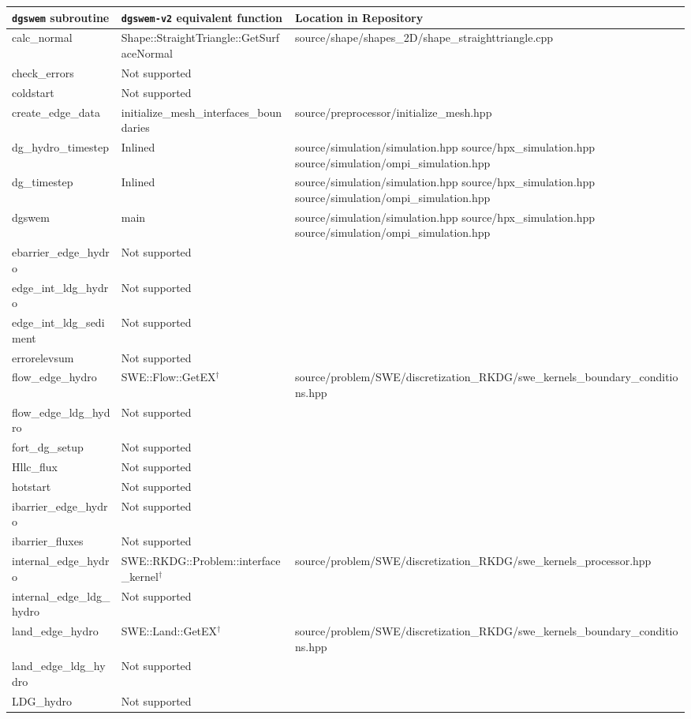 { \scriptsize
\begin{longtable}{ l | p{55mm} | p{86mm} }
\hline
\hline
{\normalsize \texttt{dgswem} subroutine} & {\normalsize \texttt{dgswem-v2} equivalent function} & 
{\normalsize Location in Repository }
\tabularnewline \hline
calc\_normal	& Shape::StraightTriangle::GetSurfaceNormal	& source/shape/shapes\_2D/shape\_straighttriangle.cpp
\tabularnewline \hline
check\_errors & Not supported &
\tabularnewline \hline	
coldstart & Not supported &
\tabularnewline \hline	
create\_edge\_data & initialize\_mesh\_interfaces\_boundaries & source/preprocessor/initialize\_mesh.hpp
\tabularnewline \hline
dg\_hydro\_timestep & Inlined	& source/simulation/simulation.hpp \newline source/hpx\_simulation.hpp \newline source/simulation/ompi\_simulation.hpp
\tabularnewline \hline
dg\_timestep	& Inlined & source/simulation/simulation.hpp \newline source/hpx\_simulation.hpp \newline source/simulation/ompi\_simulation.hpp
\tabularnewline \hline
dgswem & main & source/simulation/simulation.hpp \newline source/hpx\_simulation.hpp \newline source/simulation/ompi\_simulation.hpp
\tabularnewline \hline
ebarrier\_edge\_hydro	& Not supported &	
\tabularnewline \hline
edge\_int\_ldg\_hydro & Not supported &
\tabularnewline \hline
edge\_int\_ldg\_sediment & Not supported &	
\tabularnewline \hline
errorelevsum & Not supported &
\tabularnewline \hline
flow\_edge\_hydro & SWE::Flow::GetEX$^\dagger$ & source/problem/SWE/discretization_RKDG/swe\_kernels\_boundary\_conditions.hpp
\tabularnewline \hline
flow\_edge\_ldg\_hydro	& Not supported &
\tabularnewline \hline
fort\_dg\_setup & Not supported &	
\tabularnewline \hline
Hllc\_flux & Not supported &
\tabularnewline \hline
hotstart & Not supported &	
\tabularnewline \hline
ibarrier\_edge\_hydro	& Not supported &	
\tabularnewline \hline
ibarrier\_fluxes & Not supported &
\tabularnewline \hline
internal\_edge\_hydro & SWE::RKDG::Problem::interface\_kernel$^\dagger$ & source/problem/SWE/discretization_RKDG/swe\_kernels\_processor.hpp
\tabularnewline \hline
internal\_edge\_ldg\_hydro & Not supported &
\tabularnewline \hline
land\_edge\_hydro & SWE::Land::GetEX$^\dagger$ & source/problem/SWE/discretization_RKDG/swe\_kernels\_boundary\_conditions.hpp
\tabularnewline \hline
land\_edge\_ldg\_hydro & Not supported &
\tabularnewline \hline
LDG\_hydro & Not supported &
\tabularnewline \hline

\end{longtable}}
